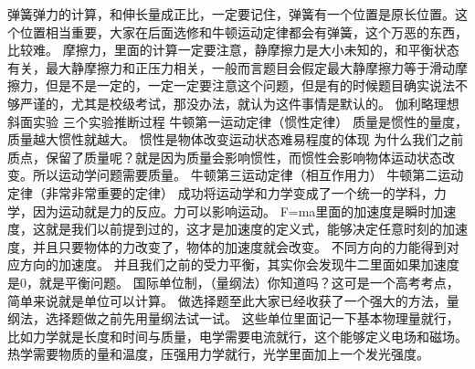 {}弹簧弹力的计算，和伸长量成正比，一定要记住，弹簧有一个位置是原长位置。这个位置相当重要，大家在后面选修和牛顿运动定律都会有弹簧，这个万恶的东西，比较难。\markdownRendererParagraphSeparator
{}摩擦力，里面的计算一定要注意，静摩擦力是大小未知的，和平衡状态有关，最大静摩擦力和正压力相关，一般而言题目会假定最大静摩擦力等于滑动摩擦力，但是不是一定的，一定一定要注意这个问题，但是有的时候题目确实说法不够严谨的，尤其是校级考试，那没办法，就认为这件事情是默认的。\markdownRendererInterblockSeparator
{}
\markdownRendererSectionEnd \markdownRendererSectionBegin
{}\markdownRendererInterblockSeparator
{}伽利略理想斜面实验\markdownRendererParagraphSeparator
{}三个实验推断过程\markdownRendererParagraphSeparator
{}牛顿第一运动定律（惯性定律）\markdownRendererSoftLineBreak
{}质量是惯性的量度，质量越大惯性就越大。\markdownRendererSoftLineBreak
{}惯性是物体改变运动状态难易程度的体现\markdownRendererSoftLineBreak
{}为什么我们之前质点，保留了质量呢？就是因为质量会影响惯性，而惯性会影响物体运动状态改变。所以运动学问题需要质量。\markdownRendererParagraphSeparator
{}牛顿第三运动定律（相互作用力）\markdownRendererParagraphSeparator
{}牛顿第二运动定律（非常非常重要的定律）\markdownRendererSoftLineBreak
{}成功将运动学和力学变成了一个统一的学科，力学，因为运动就是力的反应。力可以影响运动。\markdownRendererSoftLineBreak
{}F=ma里面的加速度是瞬时加速度，这就是我们以前提到过的，这才是加速度的定义式，能够决定任意时刻的加速度，并且只要物体的力改变了，物体的加速度就会改变。\markdownRendererSoftLineBreak
{}不同方向的力能得到对应方向的加速度。\markdownRendererParagraphSeparator
{}并且我们之前的受力平衡，其实你会发现牛二里面如果加速度是0，就是平衡问题。\markdownRendererParagraphSeparator
{}国际单位制，（量纲法）你知道吗？这可是一个高考考点，简单来说就是单位可以计算。\markdownRendererSoftLineBreak
{}做选择题至此大家已经收获了一个强大的方法，量纲法，选择题做之前先用量纲法试一试。\markdownRendererSoftLineBreak
{}这些单位里面记一下基本物理量就行，比如力学就是长度和时间与质量，电学需要电流就行，这个能够定义电场和磁场。热学需要物质的量和温度，压强用力学就行，光学里面加上一个发光强度。
\markdownRendererSectionEnd 
\markdownRendererSectionEnd 
\markdownRendererSectionEnd \markdownRendererDocumentEnd